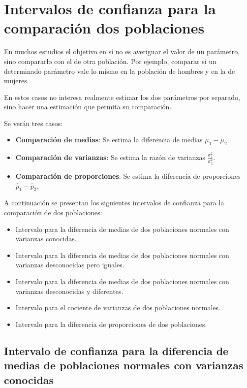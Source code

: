 \documentclass[
  a4paper,
]{scrreport}
\providecommand{\tightlist}{%
  \setlength{\itemsep}{0pt}\setlength{\parskip}{0pt}}\usepackage{longtable,booktabs,array}
\theoremstyle{definition}
\theoremstyle{definition}
\theoremstyle{plain}
\theoremstyle{remark}
\begin{document}
\hypertarget{intervalos-de-confianza-para-la-comparaciuxf3n-dos-poblaciones}{%
\section{Intervalos de confianza para la comparación dos
poblaciones}\label{intervalos-de-confianza-para-la-comparaciuxf3n-dos-poblaciones}}

En muchos estudios el objetivo en sí no es averiguar el valor de un
parámetro, sino compararlo con el de otra población. Por ejemplo,
comparar si un determinado parámetro vale lo mismo en la población de
hombres y en la de mujeres.

En estos casos no interesa realmente estimar los dos parámetros por
separado, sino hacer una estimación que permita su comparación.

Se verán tres casos:

\begin{itemize}
\tightlist
\item
  \textbf{Comparación de medias}: Se estima la diferencia de medias
  \(\mu_1-\mu_2\).
\item
  \textbf{Comparación de varianzas}: Se estima la razón de varianzas
  \(\displaystyle \frac{\sigma^2_1}{\sigma^2_2}\).
\item
  \textbf{Comparación de proporciones}: Se estima la diferencia de
  proporciones \(\hat p_1-\hat p_2\).
\end{itemize}

A continuación se presentan los siguientes intervalos de confianza para
la comparación de dos poblaciones:

\begin{itemize}
\tightlist
\item
  Intervalo para la diferencia de medias de dos poblaciones normales con
  varianzas conocidas.
\item
  Intervalo para la diferencia de medias de dos poblaciones normales con
  varianzas desconocidas pero iguales.
\item
  Intervalo para la diferencia de medias de dos poblaciones normales con
  varianzas desconocidas y diferentes.
\item
  Intervalo para el cociente de varianzas de dos poblaciones normales.
\item
  Intervalo para la diferencia de proporciones de dos poblaciones.
\end{itemize}

\hypertarget{intervalo-de-confianza-para-la-diferencia-de-medias-de-poblaciones-normales-con-varianzas-conocidas}{%
\subsection{Intervalo de confianza para la diferencia de medias de
poblaciones normales con varianzas
conocidas}\label{intervalo-de-confianza-para-la-diferencia-de-medias-de-poblaciones-normales-con-varianzas-conocidas}}
\end{document}

